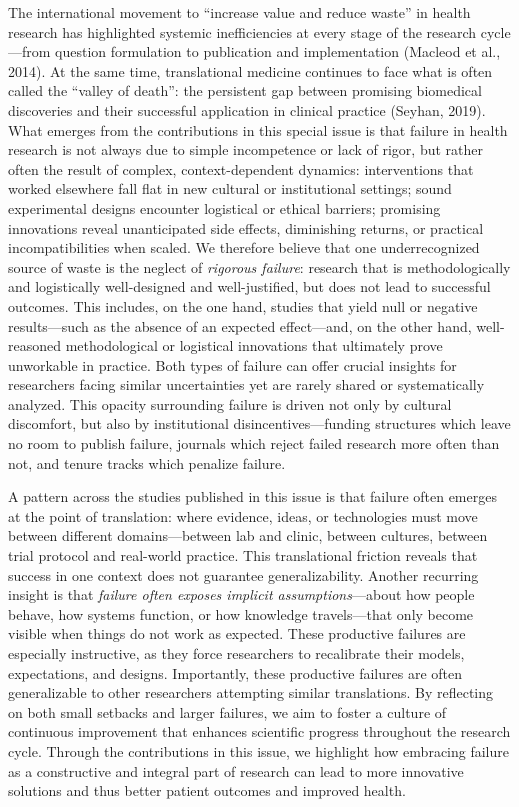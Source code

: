 \documentclass[authordate, empirical, issue]{jote-new-article}
\begin{document}
	The international movement to “increase value and reduce waste” in health research has highlighted systemic inefficiencies at every stage of the research cycle—from question formulation to publication and implementation (Macleod et al., 2014). At the same time, translational medicine continues to face what is often called the “valley of death”: the persistent gap between promising biomedical discoveries and their successful application in clinical practice (Seyhan, 2019). What emerges from the contributions in this special issue is that failure in health research is not always due to simple incompetence or lack of rigor, but rather often the result of complex, context-dependent dynamics: interventions that worked elsewhere fall flat in new cultural or institutional settings; sound experimental designs encounter logistical or ethical barriers; promising innovations reveal unanticipated side effects, diminishing returns, or practical incompatibilities when scaled. We therefore believe that one underrecognized source of waste is the neglect of \emph{rigorous failure}: research that is methodologically and logistically well-designed and well-justified, but does not lead to successful outcomes. This includes, on the one hand, studies that yield null or negative results—such as the absence of an expected effect—and, on the other hand, well-reasoned methodological or logistical innovations that ultimately prove unworkable in practice. Both types of failure can offer crucial insights for researchers facing similar uncertainties yet are rarely shared or systematically analyzed. This opacity surrounding failure is driven not only by cultural discomfort, but also by institutional disincentives—funding structures which leave no room to publish failure, journals which reject failed research more often than not, and tenure tracks which penalize failure.



	A pattern across the studies published in this issue is that failure often emerges at the point of translation: where evidence, ideas, or technologies must move between different domains—between lab and clinic, between cultures, between trial protocol and real-world practice. This translational friction reveals that success in one context does not guarantee generalizability. Another recurring insight is that \emph{failure often exposes implicit assumptions}—about how people behave, how systems function, or how knowledge travels—that only become visible when things do not work as expected. These productive failures are especially instructive, as they force researchers to recalibrate their models, expectations, and designs. Importantly, these productive failures are often generalizable to other researchers attempting similar translations. By reflecting on both small setbacks and larger failures, we aim to foster a culture of continuous improvement that enhances scientific progress throughout the research cycle. Through the contributions in this issue, we highlight how embracing failure as a constructive and integral part of research can lead to more innovative solutions and thus better patient outcomes and improved health.
\end{document}

